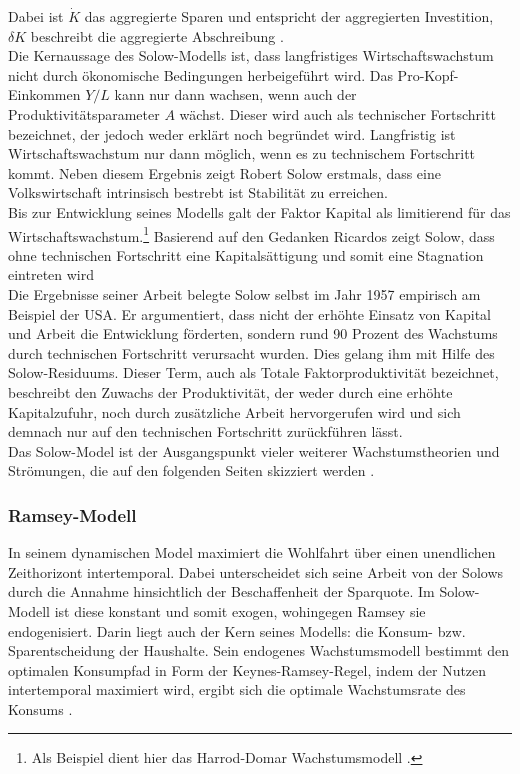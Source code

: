Dabei ist $\dot{K}$ das aggregierte Sparen und entspricht der aggregierten Investition, $\delta K$ beschreibt die aggregierte Abschreibung \cite{Solow.1956}.\\ Die Kernaussage des Solow-Modells ist, dass langfristiges Wirtschaftswachstum nicht durch ökonomische Bedingungen herbeigeführt wird. Das Pro-Kopf-Einkommen ${Y}/{L}$ kann nur dann wachsen, wenn auch der Produktivitätsparameter $A$ wächst. Dieser wird auch als technischer Fortschritt bezeichnet, der jedoch weder erklärt noch begründet wird. Langfristig ist Wirtschaftswachstum nur dann möglich, wenn es zu technischem Fortschritt kommt. Neben diesem Ergebnis zeigt Robert Solow erstmals, dass eine Volkswirtschaft intrinsisch bestrebt ist Stabilität zu erreichen.\\ Bis zur Entwicklung seines Modells galt der Faktor Kapital als limitierend für das Wirtschaftswachstum.\footnote{Als Beispiel dient hier das Harrod-Domar Wachstumsmodell \cite{Harrod.1939,Domar.1946}.} Basierend auf den Gedanken Ricardos zeigt Solow, dass ohne technischen Fortschritt eine Kapitalsättigung und somit eine Stagnation eintreten wird \cite{Solow.1956} \\ Die Ergebnisse seiner Arbeit belegte Solow selbst im Jahr 1957 empirisch am Beispiel der USA. Er argumentiert, dass nicht der erhöhte Einsatz von Kapital und Arbeit die Entwicklung förderten, sondern rund 90 Prozent des Wachstums durch technischen Fortschritt verursacht wurden. Dies gelang ihm mit Hilfe des Solow-Residuums. Dieser Term, auch als Totale Faktorproduktivität bezeichnet, beschreibt den Zuwachs der Produktivität, der weder durch eine erhöhte Kapitalzufuhr, noch durch zusätzliche Arbeit hervorgerufen wird und sich demnach nur auf den technischen Fortschritt zurückführen lässt.\\ 
%
Das Solow-Model ist der Ausgangspunkt vieler weiterer Wachstumstheorien und Strömungen, die auf den folgenden Seiten skizziert werden \cite{Aghion.2015}.
%
\subsubsection*{Ramsey-Modell}
In seinem dynamischen Model maximiert \cite{Ramsey.1928} die Wohlfahrt über einen unendlichen Zeithorizont intertemporal. Dabei unterscheidet sich seine Arbeit von der Solows durch die Annahme hinsichtlich der Beschaffenheit der Sparquote. Im Solow-Modell ist diese konstant und somit exogen, wohingegen Ramsey sie endogenisiert. Darin liegt auch der Kern seines Modells: die Konsum- bzw. Sparentscheidung der Haushalte. Sein endogenes Wachstumsmodell bestimmt den optimalen Konsumpfad in Form der Keynes-Ramsey-Regel, indem der Nutzen intertemporal maximiert wird, ergibt sich die optimale Wachstumsrate des Konsums \cite{Ramsey.1928}.
\bigskip


